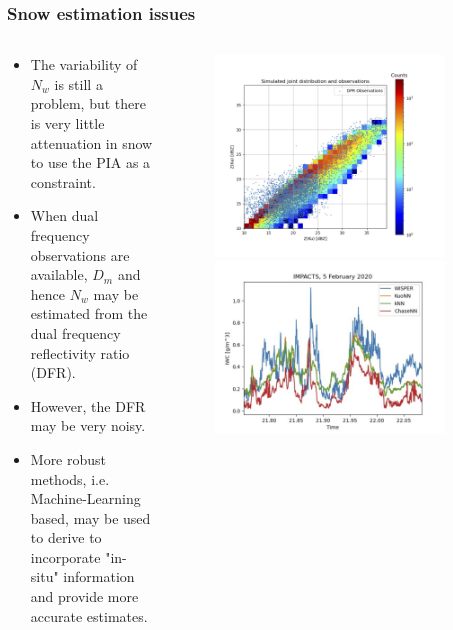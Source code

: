 \documentclass{beamer}
\begin{document}
\begin{frame}
\frametitle{Snow estimation issues}
\begin{columns}
\begin{column}{0.58\textwidth}
    \begin{itemize}
    \item The variability of $N_w$ is still a problem, but there is very little
    attenuation in snow to use the PIA as a constraint.
    \item When dual frequency observations are available, $D_m$ and hence
    $N_w$ may be estimated from the dual frequency reflectivity ratio (DFR).
    \item However, the DFR may be very noisy.
    \item More robust methods, i.e. Machine-Learning based, may be used 
    to derive to incorporate "in-situ" information and provide
    more accurate estimates.
    \end{itemize}
\end{column}
\begin{column}{0.5\textwidth}
\begin{figure}
\begin{center}
\includegraphics[width=0.9\textwidth]{Figures/fig7.png}
\includegraphics[width=0.9\textwidth]{Figures/Fig8.png}

\end{center}
\end{figure}
\end{column}
\end{columns}
\end{frame}
\end{document}
